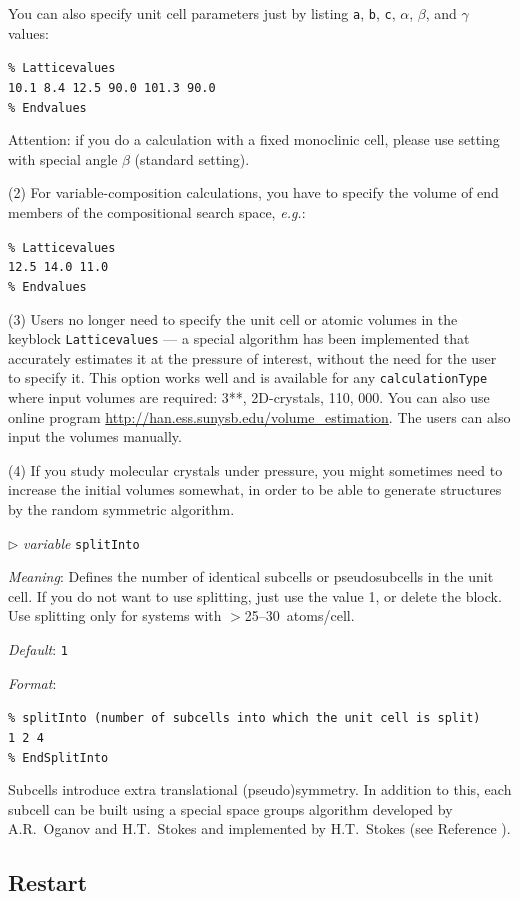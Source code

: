\documentclass[12pt]{article}
\newcommand{\keyword}[1]{\texttt{#1}}
\newcommand{\textshift}[1]{{\addtolength{\leftskip}{10mm}\texttt{{#1}}\par}}
\newcommand{\paramacro}[6]{
\vspace{0.5cm}
$\triangleright$ \emph{variable} {\color{blue} \texttt{#1}}

\emph{Meaning}: {#2}

{#3}

\emph{Default}: \texttt{#4}

\emph{Format}:

{\addtolength{\leftskip}{10mm} 
\texttt{#5}
\par}


{\small #6}

}
\begin{document}
You can also specify unit cell parameters just by listing \keyword{a},
\keyword{b}, \keyword{c}, $\alpha$, $\beta$, and $\gamma$ values:

\textshift{\% Latticevalues \\ 
10.1 8.4 12.5 90.0 101.3 90.0 \\
\% Endvalues
}

Attention: if you do a calculation with a fixed monoclinic cell, please use
setting with special angle $\beta$ (standard setting).

(2) For variable-composition calculations, you have to specify the volume of
end members of the compositional search space, \emph{e.g.}:

\textshift{\% Latticevalues \\
12.5 14.0 11.0 \\
\% Endvalues 
}

(3) Users no longer need to specify the unit cell or atomic volumes in the
keyblock \keyword{Latticevalues} --- a special algorithm has been implemented
that accurately estimates it at the pressure of interest, without the need for
the user to specify it. This option works well and is available for any
\keyword{calculationType} where input volumes are required: 3**, 2D-crystals,
110, 000. You can also use online program
\textcolor{blue}{\url{http://han.ess.sunysb.edu/volume_estimation}}. The users
can also input the volumes manually.

(4) If you study molecular crystals under pressure, you might sometimes need to
increase the initial volumes somewhat, in order to be able to generate
structures by the random symmetric algorithm.


\paramacro{splitInto}{Defines the number of identical subcells or pseudosubcells
in the unit cell. If you do not want to use splitting, just use the value 1, or
delete the block. Use splitting only for systems with
$>$25--30~atoms/cell.}{}{1}
{\% splitInto (number of subcells into which the unit cell is split) \\
1 2 4 \\
\% EndSplitInto}{}

Subcells introduce extra translational (pseudo)symmetry. In addition to this,
each subcell can be built using a special space groups algorithm developed by
A.R.~Oganov and H.T.~Stokes and implemented by H.T.~Stokes (see Reference
\cite{Lyakhov2013}).


\subsection{Restart} \label{input_restart}
\end{document}
